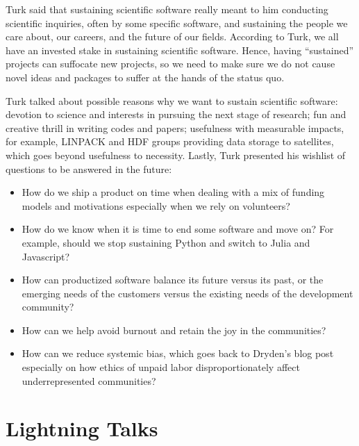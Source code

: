 \documentclass[11pt, oneside]{amsart}
\newcommand{\note}[1]{ {\textcolor{blueish}    { ***Note:      #1 }}}
\begin{document}
Turk said that sustaining scientific software really meant to him conducting
scientific inquiries, often by some specific software, and sustaining the people
we care about, our careers, and the future of our fields. According to Turk, we
all have an invested stake in sustaining scientific software. Hence, having
``sustained'' projects can suffocate new projects, so we need to make sure we
do not cause novel ideas and packages to suffer at the hands of the status quo.

Turk talked about possible reasons why we want to sustain scientific software:
devotion to science and interests in pursuing the next stage of research; fun
and creative thrill in writing codes and papers; usefulness with measurable
impacts, for example, LINPACK and HDF groups providing data storage to
satellites, which goes beyond usefulness to necessity. Lastly, Turk presented
his wishlist of questions to be answered in the future:
%
\begin{itemize} 

\item How do we ship a product on time when dealing with a mix of funding models
and motivations especially when we rely on volunteers?

\item How do we know when it is time to end some software and move on? For
example, should we stop sustaining Python and switch to Julia and Javascript?
 
\item How can productized software balance its future versus its past, or the
emerging needs of the customers versus the existing needs of the development
community?

\item How can we help avoid burnout and retain the joy in the communities?

\item How can we reduce systemic bias, which goes back to Dryden's blog post
especially on how ethics of unpaid labor disproportionately affect
underrepresented communities?

\end{itemize}

\section{Lightning Talks} \label{sec:lightning}
\begin{comment}
\note{
\href{http://wssspe.researchcomputing.org.uk/wssspe3/agenda/}{Slides.}}
\end{comment}
\end{document}
